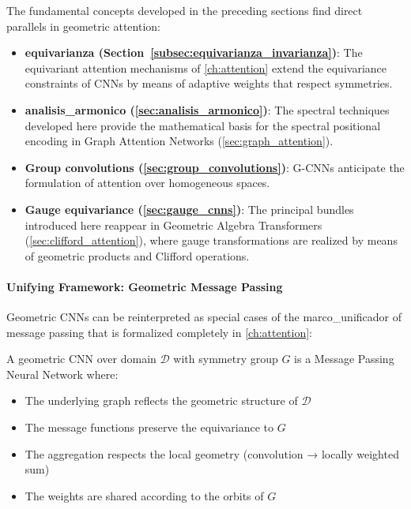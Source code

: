 The fundamental concepts developed in the preceding sections find direct parallels in geometric attention:

\begin{itemize}
\item \textbf{\gls{equivarianza} (Section~\ref{subsec:equivarianza_invarianza})}: The equivariant attention mechanisms of \autoref{ch:attention} extend the equivariance constraints of CNNs by means of adaptive weights that respect symmetries.

\item \textbf{\gls{analisis_armonico} (\autoref{sec:analisis_armonico})}: The spectral techniques developed here provide the mathematical basis for the spectral positional encoding in Graph Attention Networks (\autoref{sec:graph_attention}).

\item \textbf{Group convolutions (\autoref{sec:group_convolutions})}: G-CNNs anticipate the formulation of attention over homogeneous spaces.

\item \textbf{Gauge equivariance (\autoref{sec:gauge_cnns})}: The principal bundles introduced here reappear in Geometric Algebra Transformers (\autoref{sec:clifford_attention}), where gauge transformations are realized by means of geometric products and Clifford operations.
\end{itemize}

\paragraph{Unifying Framework: Geometric Message Passing}

Geometric CNNs can be reinterpreted as special cases of the \gls{marco_unificador} of message passing that is formalized completely in \autoref{ch:attention}:

\begin{definition}\label{def:cnn_as_structured_mp}
A geometric CNN over domain $\mathcal{D}$ with symmetry group $G$ is a Message Passing Neural Network where:
\begin{itemize}
    \item The underlying graph reflects the geometric structure of $\mathcal{D}$
    \item The message functions preserve the equivariance to $G$
    \item The aggregation respects the local geometry (convolution → locally weighted sum)
    \item The weights are shared according to the orbits of $G$
\end{itemize}
\end{definition}

